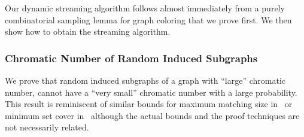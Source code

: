 \documentclass[11pt]{article}
\theoremstyle{definition}
\begin{document}
Our dynamic streaming algorithm follows almost immediately from a purely combinatorial sampling lemma for graph coloring that we prove first. We then
show how to obtain the streaming algorithm. 

\subsubsection{Chromatic Number of Random Induced Subgraphs}\label{sec:vertex-induced}

We prove that random induced subgraphs of a graph with ``large'' chromatic number, cannot have a ``very small'' chromatic number with a large probability. This result is reminiscent of similar 
bounds for maximum matching size in~\cite{AssadiKL17} or minimum set cover in~\cite{AssadiKL16} although the actual bounds and  the proof techniques are not necessarily related. 
\end{document}
